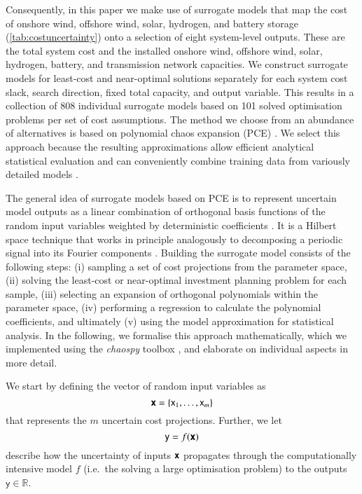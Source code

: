 
Consequently, in this paper we make use of surrogate models that map the
cost of onshore wind, offshore wind, solar, hydrogen, and battery storage (\cref{tab:costuncertainty})
onto a selection of eight system-level outputs.
These are the total system cost and the installed onshore wind, offshore wind, solar, hydrogen, battery, and transmission network capacities.
We construct surrogate models for least-cost and near-optimal solutions separately
for each system cost slack, search direction, fixed total capacity, and output variable. This results in a collection of 808 individual surrogate models based on 101 solved optimisation problems
per set of cost assumptions.
The method we choose from an abundance of alternatives is based on polynomial chaos expansion (PCE)
\cite{sudret_global_2008,fajraoui_optimal_2017,gratiet_metamodel-based_2015}.
We select this approach because the resulting approximations
allow efficient analytical statistical evaluation \cite{sudret_global_2008} and
can conveniently combine training data from variously detailed models \cite{palar_multi-fidelity_2016}.


The general idea of surrogate models based on PCE is to
represent uncertain model outputs as a linear combination of orthogonal basis functions
of the random input variables weighted by deterministic coefficients \cite{muhlpfordt_uncertainty_2020}.
It is a Hilbert space technique that works in principle analogously to decomposing a periodic signal into its Fourier components \cite{muhlpfordt_uncertainty_2020}.
Building the surrogate model consists of the following steps:
(i) sampling a set of cost projections from the parameter space,
(ii) solving the least-cost or near-optimal investment planning problem for each sample,
(iii) selecting an expansion of orthogonal polynomials within the parameter space,
(iv) performing a regression to calculate the polynomial coefficients, and ultimately
(v) using the model approximation for statistical analysis.
In the following, we formalise this approach mathematically,
which we implemented using the \textit{chaospy} toolbox \cite{feinberg_chaospy_2015},
and elaborate on individual aspects in more detail.

We start by defining the vector of random input variables as
\begin{equation}
    \boldsymbol{\mathsf{x}} = \{\mathsf{x}_1, \dots , \mathsf{x}_m\}
\end{equation}
that represents the $m$ uncertain cost projections.
Further, we let
\begin{equation}
    \mathsf{y} = f(\boldsymbol{\mathsf{x}})
\end{equation}
describe how the uncertainty of inputs $\boldsymbol{\mathsf{x}}$ propagates
through the computationally intensive model $f$
(i.e.~the solving a large optimisation problem)
to the outputs $\mathsf{y} \in \mathbb{R}$.

